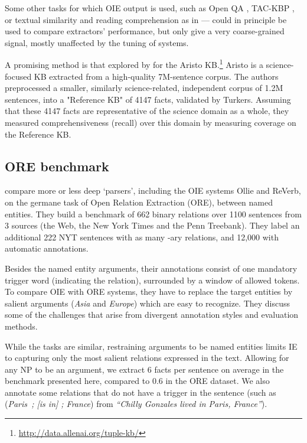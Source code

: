 \pdfoutput=1 \documentclass[11pt, a4paper]{article}
\begin{document}
Some other tasks for which OIE output is used, such as Open QA
\cite{Fader:2014:OQA:2623330.2623677}, TAC-KBP
\cite{DBLP:conf/tac/SoderlandGBEW13}, or textual similarity and reading
comprehension as in \cite{stanovsky-dagan:2015:ACL-IJCNLP} --- could in
principle be used to compare extractors' performance, but only give a very
coarse-grained signal, mostly unaffected by the tuning of systems.

A promising method is that explored by \citet{DBLP:journals/tacl/MishraTC17}
for the Aristo KB.\footnote{\url{http://data.allenai.org/tuple-kb/}} Aristo is a
science-focused KB extracted from a high-quality 7M-sentence corpus. The
authors preprocessed a smaller, similarly science-related, independent
corpus of 1.2M sentences, into a "Reference KB" of 4147 facts, validated by
Turkers. Assuming that these 4147 facts are representative of the science
domain as a whole, they measured comprehensiveness (recall) over this domain
by measuring coverage on the Reference KB.

\subsection{ORE benchmark}
\label{sec:orgea721fe}

\citet{mesquita-schmidek-barbosa:2013:EMNLP} compare more or less deep
`parsers', including the OIE systems Ollie and ReVerb, on the germane task
of Open Relation Extraction (ORE), between named entities. They build a benchmark
of 662 binary relations over 1100 sentences from 3 sources (the Web, the
New York Times and the Penn Treebank). They label an additional 222 NYT
sentences with as many -ary relations, and 12,000 with
automatic annotations. 

Besides the named entity arguments, their annotations consist of one
mandatory trigger word (indicating the relation), surrounded by a window of
allowed tokens. To compare OIE with ORE systems, they have to replace the
target entities by salient arguments (\emph{Asia} and \emph{Europe}) which are easy
to recognize. They discuss some of the challenges that arise from divergent
annotation styles and evaluation methods.

While the tasks are similar, restraining arguments to be named entities
limits IE to capturing only the most salient relations expressed in the
text. Allowing for any NP to be an argument, we extract 6 facts per
sentence on average in the benchmark presented here, compared to 0.6 in
the ORE dataset. We also annotate some relations that do not have a trigger
in the sentence (such as (\emph{Paris~; [is in] ; France}) from \emph{``Chilly Gonzales
lived in Paris, France''}).
\end{document}
